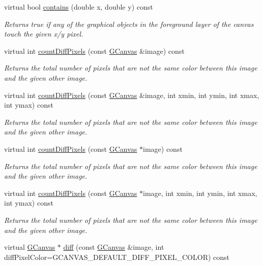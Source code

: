 \begin{DoxyCompactItemize}
virtual bool \mbox{\hyperlink{classGCanvas_abb6a5d7c03e6eaaae97264c4799ce7c3}{contains}} (double x, double y) const
\begin{DoxyCompactList}\small\item\em Returns true if any of the graphical objects in the foreground layer of the canvas touch the given x/y pixel. \end{DoxyCompactList}\item 
virtual int \mbox{\hyperlink{classGCanvas_ad3d6147a5e08ed97bb71c7f267ef071b}{count\+Diff\+Pixels}} (const \mbox{\hyperlink{classGCanvas}{G\+Canvas}} \&image) const
\begin{DoxyCompactList}\small\item\em Returns the total number of pixels that are not the same color between this image and the given other image. \end{DoxyCompactList}\item 
virtual int \mbox{\hyperlink{classGCanvas_a3ed6edef8ed522bbfc09d8f6005d6d8e}{count\+Diff\+Pixels}} (const \mbox{\hyperlink{classGCanvas}{G\+Canvas}} \&image, int xmin, int ymin, int xmax, int ymax) const
\begin{DoxyCompactList}\small\item\em Returns the total number of pixels that are not the same color between this image and the given other image. \end{DoxyCompactList}\item 
virtual int \mbox{\hyperlink{classGCanvas_a443b0f63a197c0f1147b13077f4206e0}{count\+Diff\+Pixels}} (const \mbox{\hyperlink{classGCanvas}{G\+Canvas}} $\ast$image) const
\begin{DoxyCompactList}\small\item\em Returns the total number of pixels that are not the same color between this image and the given other image. \end{DoxyCompactList}\item 
virtual int \mbox{\hyperlink{classGCanvas_a77b38a94630c93ecc697fb12a1fb89fd}{count\+Diff\+Pixels}} (const \mbox{\hyperlink{classGCanvas}{G\+Canvas}} $\ast$image, int xmin, int ymin, int xmax, int ymax) const
\begin{DoxyCompactList}\small\item\em Returns the total number of pixels that are not the same color between this image and the given other image. \end{DoxyCompactList}\item 
virtual \mbox{\hyperlink{classGCanvas}{G\+Canvas}} $\ast$ \mbox{\hyperlink{classGCanvas_aa4e74e40eebb70c9616065056de5c4ca}{diff}} (const \mbox{\hyperlink{classGCanvas}{G\+Canvas}} \&image, int diff\+Pixel\+Color=G\+C\+A\+N\+V\+A\+S\+\_\+\+D\+E\+F\+A\+U\+L\+T\+\_\+\+D\+I\+F\+F\+\_\+\+P\+I\+X\+E\+L\+\_\+\+C\+O\+L\+OR) const

\end{DoxyCompactItemize}

